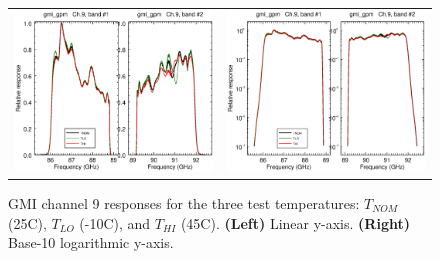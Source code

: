 \begin{figure}[htp]
  \centering
  \begin{tabular}{c c}
    \includegraphics[scale=0.3]{graphics/lin/gmi_gpm-9.eps} &
    \includegraphics[scale=0.3]{graphics/log/gmi_gpm-9.eps}
  \end{tabular}
  \caption{GMI channel 9 responses for the three test temperatures: $T_{NOM}$ (25\textdegree{}C), $T_{LO}$ (-10\textdegree{}C), and $T_{HI}$ (45\textdegree{}C). \textbf{(Left)} Linear y-axis. \textbf{(Right)} Base-10 logarithmic y-axis.}
  \label{fig:ch9_response}
\end{figure}

